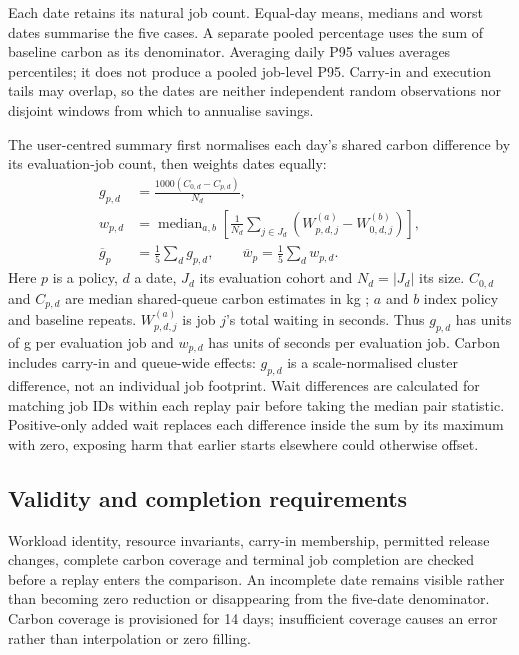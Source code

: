 Each date retains its natural job count. Equal-day means, medians and worst dates summarise the five cases. A separate pooled percentage uses the sum of baseline carbon as its denominator. Averaging daily P95 values averages percentiles; it does not produce a pooled job-level P95. Carry-in and execution tails may overlap, so the dates are neither independent random observations nor disjoint windows from which to annualise savings.

The user-centred summary first normalises each day's shared carbon difference by its evaluation-job count, then weights dates equally:
\begin{align}
g_{p,d}&=\frac{1000(C_{0,d}-C_{p,d})}{N_d},\label{eq:normalised-carbon}\\
w_{p,d}&=\operatorname{median}_{a,b}\left[\frac{1}{N_d}\sum_{j\in J_d}
\left(W^{(a)}_{p,d,j}-W^{(b)}_{0,d,j}\right)\right],\label{eq:paired-wait}\\
\overline g_p&=\frac{1}{5}\sum_d g_{p,d},\qquad
\overline w_p=\frac{1}{5}\sum_d w_{p,d}.\label{eq:equal-day}
\end{align}
Here $p$ is a policy, $d$ a date, $J_d$ its evaluation cohort and $N_d=|J_d|$ its size. $C_{0,d}$ and $C_{p,d}$ are median shared-queue carbon estimates in kg \co; $a$ and $b$ index policy and baseline repeats. $W_{p,d,j}^{(a)}$ is job $j$'s total waiting in seconds. Thus $g_{p,d}$ has units of g \co{} per evaluation job and $w_{p,d}$ has units of seconds per evaluation job. Carbon includes carry-in and queue-wide effects: $g_{p,d}$ is a scale-normalised cluster difference, not an individual job footprint. Wait differences are calculated for matching job IDs within each replay pair before taking the median pair statistic. Positive-only added wait replaces each difference inside the sum by its maximum with zero, exposing harm that earlier starts elsewhere could otherwise offset.

\subsection{Validity and completion requirements}
Workload identity, resource invariants, carry-in membership, permitted release changes, complete carbon coverage and terminal job completion are checked before a replay enters the comparison. An incomplete date remains visible rather than becoming zero reduction or disappearing from the five-date denominator. Carbon coverage is provisioned for 14 days; insufficient coverage causes an error rather than interpolation or zero filling.

